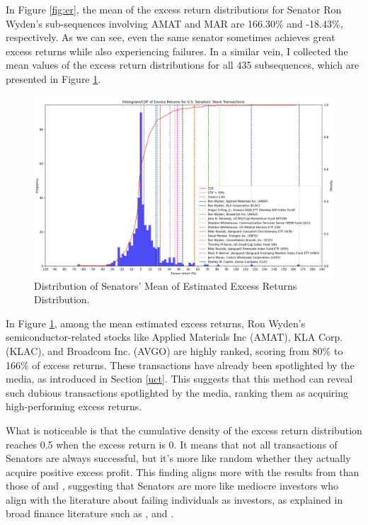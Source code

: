\documentclass[15pt,letterpaper]{article}
\begin{document}
  In Figure \ref{fig:er}, the mean of the excess return distributions for Senator Ron Wyden's sub-sequences involving AMAT and MAR are 166.30\% and -18.43\%, respectively. 
  As we can see, even the same senator sometimes achieves great excess returns while also experiencing failures. 
  In a similar vein, I collected the mean values of the excess return distributions for all 435 subsequences, which are presented in Figure \ref{fig:erfin}.

\begin{figure}[h!]
  \centering
  \includegraphics[width=1\textwidth, height=0.5\textheight]{imgs/ERFin3.png}
  \caption{Distribution of Senators' Mean of Estimated Excess Returns Distribution.}
  \label{fig:erfin}
\end{figure}

In Figure \ref{fig:erfin}, among the mean estimated excess returns, Ron Wyden's semiconductor-related stocks like Applied Materials Inc (AMAT), KLA Corp. (KLAC), and Broadcom Inc. (AVGO) are highly ranked, scoring from 80\% to 166\% of excess returns. These transactions have already been spotlighted by the media, as introduced in Section \ref{uct}. This suggests that this method can reveal such dubious transactions spotlighted by the media, ranking them as acquiring high-performing excess returns.

What is noticeable is that the cumulative density of the excess return distribution reaches 0.5 when the excess return is 0. It means that not all transactions of Senators are always successful, but it's more like random whether they actually acquire positive excess profit. This finding aligns more with the results from \cite{eg13} than those of \cite{zi24} and \cite{zi11}, suggesting that Senators are more like mediocre investors who align with the literature about failing individuals as investors, as explained in broad finance literature such as \cite{barberis2003}, and \cite{barber2000}.
\end{document}
